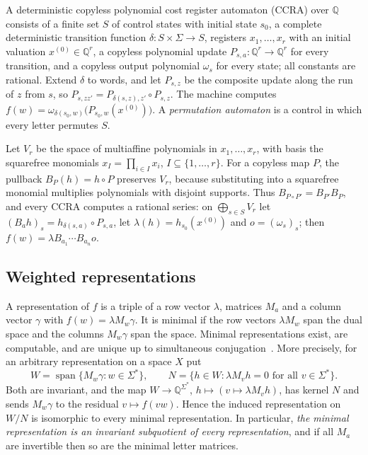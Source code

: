 \documentclass[11pt,letterpaper]{article}
\newcommand{\Q}{\mathbb{Q}}
\newcommand{\spn}{\operatorname{span}}
\theoremstyle{definition}
\begin{document}
A deterministic copyless polynomial cost register automaton (CCRA) over $\Q$ consists of a finite set $S$ of control states with initial state $s_0$, a complete deterministic transition function $\delta:S\times\Sigma\to S$, registers $x_1,\ldots,x_r$ with an initial valuation $x^{(0)}\in\Q^r$, a copyless polynomial update $P_{s,a}:\Q^r\to\Q^r$ for every transition, and a copyless output polynomial $\omega_s$ for every state; all constants are rational. Extend $\delta$ to words, and let $P_{s,z}$ be the composite update along the run of $z$ from $s$, so $P_{s,zz'}=P_{\delta(s,z),z'}\circ P_{s,z}$. The machine computes $f(w)=\omega_{\delta(s_0,w)}\bigl(P_{s_0,w}(x^{(0)})\bigr)$. A \emph{permutation automaton} is a control in which every letter permutes $S$.

Let $V_r$ be the space of multiaffine polynomials in $x_1,\ldots,x_r$, with basis the squarefree monomials $x_I=\prod_{i\in I}x_i$, $I\subseteq\{1,\ldots,r\}$. For a copyless map $P$, the pullback $B_P(h)=h\circ P$ preserves $V_r$, because substituting into a squarefree monomial multiplies polynomials with disjoint supports. Thus $B_{P\circ P'}=B_{P'}B_P$, and every CCRA computes a rational series: on $\bigoplus_{s\in S}V_r$ let $(B_ah)_s=h_{\delta(s,a)}\circ P_{s,a}$, let $\lambda(h)=h_{s_0}(x^{(0)})$ and $o=(\omega_s)_s$; then $f(w)=\lambda B_{a_1}\cdots B_{a_n}o$.

\subsection{Weighted representations}
A representation of $f$ is a triple of a row vector $\lambda$, matrices $M_a$ and a column vector $\gamma$ with $f(w)=\lambda M_w\gamma$. It is minimal if the row vectors $\lambda M_w$ span the dual space and the columns $M_w\gamma$ span the space. Minimal representations exist, are computable, and are unique up to simultaneous conjugation~\cite{Sch61,BR11}. More precisely, for an arbitrary representation on a space $X$ put
\begin{equation}\label{eq:WN}
W=\spn\{M_w\gamma:w\in\Sigma^*\},\qquad N=\{h\in W:\lambda M_vh=0\text{ for all }v\in\Sigma^*\}.
\end{equation}
Both are invariant, and the map $W\to\Q^{\Sigma^*}$, $h\mapsto(v\mapsto\lambda M_vh)$, has kernel $N$ and sends $M_w\gamma$ to the residual $v\mapsto f(vw)$. Hence the induced representation on $W/N$ is isomorphic to every minimal representation. In particular, \emph{the minimal representation is an invariant subquotient of every representation}, and if all $M_a$ are invertible then so are the minimal letter matrices.
\end{document}
